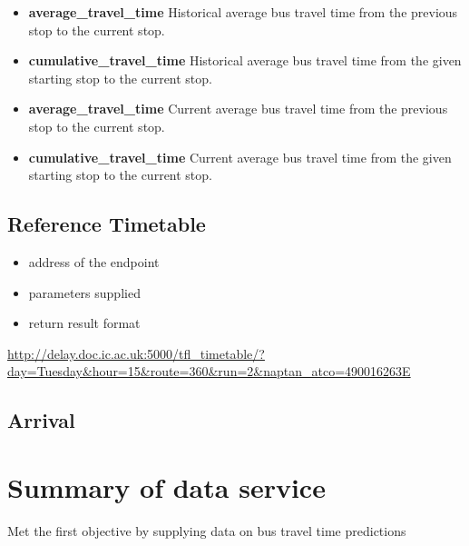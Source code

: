 \begin{itemize}
  \item \textbf{average\_travel\_time} Historical average bus travel time from the previous stop to the current stop.
  \item \textbf{cumulative\_travel\_time} Historical average bus travel time from the given starting stop to the current stop.
  \item \textbf{average\_travel\_time} Current average bus travel time from the previous stop to the current stop.
  \item \textbf{cumulative\_travel\_time} Current average bus travel time from the given starting stop to the current stop.
\end{itemize}

\subsection{Reference Timetable}
\begin{itemize}
  \item address of the endpoint
  \item parameters supplied
  \item return result format
\end{itemize}
\url{http://delay.doc.ic.ac.uk:5000/tfl_timetable/?day=Tuesday&hour=15&route=360&run=2&naptan_atco=490016263E}
\subsection{Arrival}

\section{Summary of data service}
Met the first objective by supplying data on bus travel time predictions
